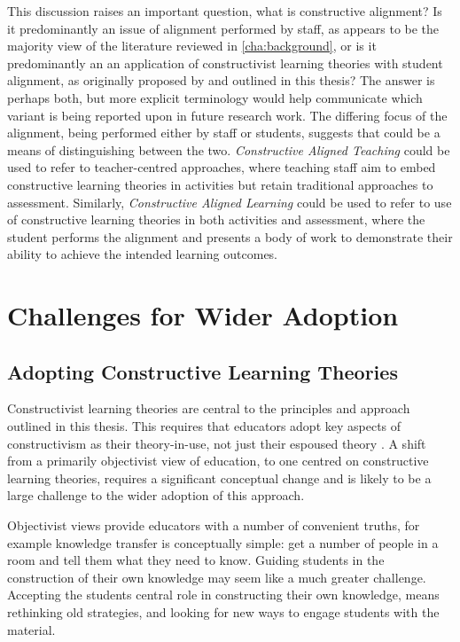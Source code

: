 This discussion raises an important question, what is constructive alignment? Is it predominantly an issue of alignment performed by staff, as appears to be the majority view of the literature reviewed in \cref{cha:background}, or is it predominantly an an application of constructivist learning theories with student alignment, as originally proposed by \citet{Biggs:1996c} and outlined in this thesis? The answer is perhaps both, but more explicit terminology would help communicate which variant is being reported upon in future research work. The differing focus of the alignment, being performed either by staff or students, suggests that could be a means of distinguishing between the two. \emph{Constructive Aligned Teaching} could be used to refer to teacher-centred approaches, where teaching staff aim to embed constructive learning theories in activities but retain traditional approaches to assessment. Similarly, \emph{Constructive Aligned Learning} could be used to refer to use of constructive learning theories in both activities and assessment, where the student performs the alignment and presents a body of work to demonstrate their ability to achieve the intended learning outcomes. 


\section{Challenges for Wider Adoption} %
\label{sec:challenges_for_wider_adoption}

\subsection{Adopting Constructive Learning Theories} %
\label{sub:adopting_constructive_learning_theories}

Constructivist learning theories are central to the principles and approach outlined in this thesis. This requires that educators adopt key aspects of constructivism as their theory-in-use, not just their espoused theory \cite{Argyris:1976}. A shift from a primarily objectivist view of education, to one centred on constructive learning theories, requires a significant conceptual change and is likely to be a large challenge to the wider adoption of this approach.  

Objectivist views provide educators with a number of convenient truths, for example knowledge transfer is conceptually simple: get a number of people in a room and tell them what they need to know. Guiding students in the construction of their own knowledge may seem like a much greater challenge. Accepting the students central role in constructing their own knowledge, means rethinking old strategies, and looking for new ways to engage students with the material. 

